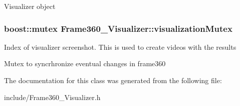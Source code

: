 Visualizer object \hypertarget{classFrame360__Visualizer_a5564c53caafff23f97fc6bb91bca058d}{
\subsubsection[{visualization\-Mutex}]{\setlength{\rightskip}{0pt plus 5cm}boost\-::mutex Frame360\-\_\-\-Visualizer\-::visualization\-Mutex}}\label{classFrame360__Visualizer_a5564c53caafff23f97fc6bb91bca058d}
Index of visualizer screenshot. This is used to create videos with the results

Mutex to syncrhronize eventual changes in frame360 

The documentation for this class was generated from the following file\-:\begin{DoxyCompactItemize}
\item 
include/Frame360\-\_\-\-Visualizer.\-h\end{DoxyCompactItemize}
